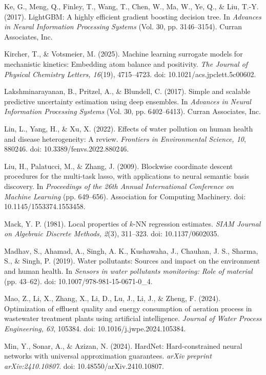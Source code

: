 \documentclass[a4paper,fleqn]{cas-sc}
\begin{document}
\noindent Ke, G., Meng, Q., Finley, T., Wang, T., Chen, W., Ma, W., Ye, Q., \& Liu, T.-Y. (2017). LightGBM: A highly efficient gradient boosting decision tree. In \textit{Advances in Neural Information Processing Systems} (Vol. 30, pp. 3146--3154). Curran Associates, Inc.

\noindent Kircher, T., \& Votsmeier, M. (2025). Machine learning surrogate models for mechanistic kinetics: Embedding atom balance and positivity. \textit{The Journal of Physical Chemistry Letters, 16}(19), 4715--4723. doi: 10.1021/acs.jpclett.5c00602.

\noindent Lakshminarayanan, B., Pritzel, A., \& Blundell, C. (2017). Simple and scalable predictive uncertainty estimation using deep ensembles. In \textit{Advances in Neural Information Processing Systems} (Vol. 30, pp. 6402--6413). Curran Associates, Inc.

\noindent Lin, L., Yang, H., \& Xu, X. (2022). Effects of water pollution on human health and disease heterogeneity: A review. \textit{Frontiers in Environmental Science, 10}, 880246. doi: 10.3389/fenvs.2022.880246.

\noindent Liu, H., Palatucci, M., \& Zhang, J. (2009). Blockwise coordinate descent procedures for the multi-task lasso, with applications to neural semantic basis discovery. In \textit{Proceedings of the 26th Annual International Conference on Machine Learning} (pp. 649--656). Association for Computing Machinery. doi: 10.1145/1553374.1553458.

\noindent Mack, Y. P. (1981). Local properties of $k$-NN regression estimates. \textit{SIAM Journal on Algebraic Discrete Methods, 2}(3), 311--323. doi: 10.1137/0602035.

\noindent Madhav, S., Ahamad, A., Singh, A. K., Kushawaha, J., Chauhan, J. S., Sharma, S., \& Singh, P. (2019). Water pollutants: Sources and impact on the environment and human health. In \textit{Sensors in water pollutants monitoring: Role of material} (pp. 43--62). doi: 10.1007/978-981-15-0671-0\_4.

\noindent Mao, Z., Li, X., Zhang, X., Li, D., Lu, J., Li, J., \& Zheng, F. (2024). Optimization of effluent quality and energy consumption of aeration process in wastewater treatment plants using artificial intelligence. \textit{Journal of Water Process Engineering, 63}, 105384. doi: 10.1016/j.jwpe.2024.105384.

\noindent Min, Y., Sonar, A., \& Azizan, N. (2024). HardNet: Hard-constrained neural networks with universal approximation guarantees. \textit{arXiv preprint arXiv:2410.10807}. doi: 10.48550/arXiv.2410.10807.
\end{document}
